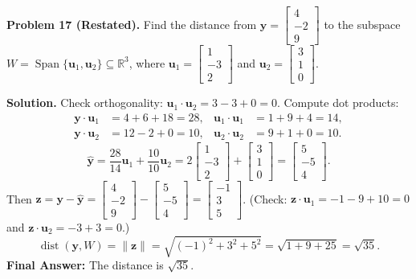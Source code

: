 \documentclass[11pt, letterpaper]{article}
\theoremstyle{definition}
\theoremstyle{remark}
\newcommand{\R}{\mathbb{R}}
\begin{document}
\medskip
\textbf{Problem 17 (Restated).} Find the distance from $\mathbf{y} = \begin{bmatrix} 4 \\ -2 \\ 9 \end{bmatrix}$ to the subspace $W = \operatorname{Span}\{\mathbf{u}_1, \mathbf{u}_2\} \subseteq \R^3$, where $\mathbf{u}_1 = \begin{bmatrix} 1 \\ -3 \\ 2 \end{bmatrix}$ and $\mathbf{u}_2 = \begin{bmatrix} 3 \\ 1 \\ 0 \end{bmatrix}$.

\textbf{Solution.}
Check orthogonality: $\mathbf{u}_1 \cdot \mathbf{u}_2 = 3 - 3 + 0 = 0$. Compute dot products:
\begin{align*}
\mathbf{y} \cdot \mathbf{u}_1 &= 4 + 6 + 18 = 28, & \mathbf{u}_1 \cdot \mathbf{u}_1 &= 1 + 9 + 4 = 14, \\
\mathbf{y} \cdot \mathbf{u}_2 &= 12 - 2 + 0 = 10, & \mathbf{u}_2 \cdot \mathbf{u}_2 &= 9 + 1 + 0 = 10.
\end{align*}
\[
\hat{\mathbf{y}} = \frac{28}{14}\mathbf{u}_1 + \frac{10}{10}\mathbf{u}_2 = 2\begin{bmatrix} 1 \\ -3 \\ 2 \end{bmatrix} + \begin{bmatrix} 3 \\ 1 \\ 0 \end{bmatrix} = \begin{bmatrix} 5 \\ -5 \\ 4 \end{bmatrix}.
\]
Then $\mathbf{z} = \mathbf{y} - \hat{\mathbf{y}} = \begin{bmatrix} 4 \\ -2 \\ 9 \end{bmatrix} - \begin{bmatrix} 5 \\ -5 \\ 4 \end{bmatrix} = \begin{bmatrix} -1 \\ 3 \\ 5 \end{bmatrix}$. (Check: $\mathbf{z}\cdot\mathbf{u}_1 = -1 - 9 + 10 = 0$ and $\mathbf{z}\cdot\mathbf{u}_2 = -3 + 3 = 0$.)
\[
\operatorname{dist}(\mathbf{y}, W) = \|\mathbf{z}\| = \sqrt{(-1)^2 + 3^2 + 5^2} = \sqrt{1 + 9 + 25} = \sqrt{35}.
\]
\textbf{Final Answer:} The distance is $\sqrt{35}$.
\end{document}
